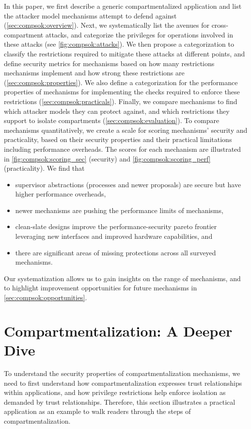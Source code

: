 In this paper, we first describe a generic compartmentalized application
and list the attacker model mechanisms attempt to defend 
against (\autoref{sec:compsok:overview}).
Next, we systematically list the avenues for cross-compartment
attacks, and categorize the privileges for operations involved in these
attacks (see \autoref{fig:compsok:attacks}).
We then propose a categorization to classify the restrictions required to 
mitigate these attacks at different points, 
and define security metrics for mechanisms based on how many restrictions 
mechanisms implement and how strong these restrictions
are (\autoref{sec:compsok:properties}).
We also define a categorization for the performance properties of mechanisms
for implementing the checks required to enforce these 
restrictions (\autoref{sec:compsok:practicals}).
Finally, we compare \nmechs mechanisms to find which attacker
models they can protect against, and which restrictions they support
to isolate compartments (\autoref{sec:compsok:evaluation}).
To compare mechanisms quantitatively, we create a scale for
scoring mechanisms' security and practicality, based on their security
properties and their practical limitations including performance overheads.
The scores for each mechanism are illustrated in 
\autoref{fig:compsok:scoring_sec} (security) and 
\autoref{fig:compsok:scoring_perf} (practicality).
We find that
\begin{itemize}
  \item supervisor abstractions (processes and newer proposals) are secure
        but have higher performance overheads,
  \item newer mechanisms are pushing the performance limits of 
        mechanisms, 
  \item clean-slate designs improve the performance-security pareto frontier
        leveraging new interfaces and improved hardware capabilities, and
  \item there are significant areas of missing protections across all
        surveyed mechanisms.
\end{itemize}
Our systematization allows us to gain insights on the range of mechanisms, 
and to highlight improvement opportunities for future mechanisms in 
\autoref{sec:compsok:opportunities}.

\section{Compartmentalization: A Deeper Dive}
\label{sec:compsok:overview}
To understand the security properties of compartmentalization mechanisms,
we need to first understand how compartmentalization expresses trust
relationships within applications, and how privilege restrictions
help enforce isolation as demanded by trust relationships.
Therefore, this section illustrates a practical application as an example
to walk readers through the steps of compartmentalization.

